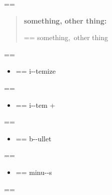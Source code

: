\documentclass{book}
\makeatletter
\newenvironment{Texinfopreformatted}{%
  \par\GNUTobeylines\obeyspaces\frenchspacing\parskip=\z@\parindent=\z@}{}
{\catcode`\^^M=13 \gdef\GNUTobeylines{\catcode`\^^M=13 \def^^M{\null\par}}}
\newenvironment{Texinfoindented}{\begin{list}{}{}\item\relax}{\end{list}}
\renewcommand{\_}{\Texinfounderscore\discretionary{}{}{}}
\makeatother
\begin{document}
\begin{Texinfoindented}
\begin{quote}
\begin{footnotesize}
\end{footnotesize}
\end{quote}
\begin{Texinfopreformatted}%
\ttfamily 
\end{Texinfopreformatted}
\begin{quote}
\begin{footnotesize}
\textbf{something, other thing:} \begin{Texinfopreformatted}%
\ttfamily something,\ other thing
\end{Texinfopreformatted}
\end{footnotesize}
\end{quote}
\begin{Texinfopreformatted}%
\ttfamily 
\end{Texinfopreformatted}
\begin{itemize}
\item \begin{Texinfopreformatted}%
\ttfamily i{-}{-}temize
\end{Texinfopreformatted}
\end{itemize}
\begin{Texinfopreformatted}%
\ttfamily 
\end{Texinfopreformatted}
\begin{itemize}[label=+]
\item \begin{Texinfopreformatted}%
\ttfamily i{-}{-}tem +
\end{Texinfopreformatted}
\end{itemize}
\begin{Texinfopreformatted}%
\ttfamily 
\end{Texinfopreformatted}
\begin{itemize}[label=\textbullet{}]
\item \begin{Texinfopreformatted}%
\ttfamily b{-}{-}ullet
\end{Texinfopreformatted}
\end{itemize}
\begin{Texinfopreformatted}%
\ttfamily 
\end{Texinfopreformatted}
\begin{itemize}[label=-]
\item \begin{Texinfopreformatted}%
\ttfamily minu{-}{-}s
\end{Texinfopreformatted}
\end{itemize}
\begin{Texinfopreformatted}%

\end{Texinfopreformatted}
\end{Texinfoindented}
\end{document}
